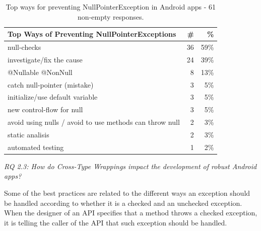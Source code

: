 \begin{table}
\scriptsize
\centering
\begin{tabular}{lrr}
\hline
\bfseries{Top Ways of Preventing NullPointerExceptions} & \bfseries{\#} & \bfseries{\%} \\
\hline
null-checks &	36 &	59\% \\
investigate/fix the cause	& 24 & 	39\% \\
@Nullable @NonNull &	8 &	13\% \\
catch null-pointer (mistake)	& 3 &	5\% \\
initialize/use default variable	& 3 &	5\% \\
new control-flow for null	& 3 &	5\% \\
avoid using nulls / avoid to use methods can throw null	& 2 &	3\% \\
static analisis	& 2 &	3\% \\
automated testing	& 1 &	2\% \\
\hline
\end{tabular}
\caption{Top ways for preventing NullPointerException in Android apps - 61 non-empty responses. }
\label{tab:preventnull}
\end{table}	

\bigskip 


\bigskip 
\noindent\emph{RQ 2.3: How do Cross-Type Wrappings impact the development of robust Android apps?}

\bigskip

Some of the best practices are related to the different ways an exception should be handled according to whether it is a checked and an unchecked exception. When the designer of an API specifies that a method throws a checked exception, it is telling the caller of the API that such exception should be handled. 

